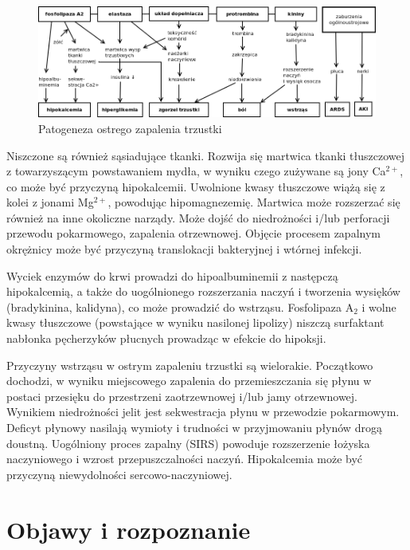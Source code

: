 \documentclass[a4paper, 12pt]{report}
\begin{document}
\begin{figure}[h]
\centering
\includegraphics[scale=0.4]{pat_pan}
\caption{Patogeneza ostrego zapalenia trzustki}
\end{figure}

Niszczone są również sąsiadujące tkanki. Rozwija się martwica tkanki
tłuszczowej z towarzyszącym powstawaniem mydła, w wyniku czego
zużywane są jony Ca$^{2+}$, co może być przyczyną
hipokalcemii. Uwolnione kwasy tłuszczowe wiążą się z kolei z jonami
Mg$^{2+}$, powodując hipomagnezemię. Martwica może rozszerzać się
również na inne okoliczne narządy. Może dojść do niedrożności i/lub
perforacji przewodu pokarmowego, zapalenia otrzewnowej. Objęcie
procesem zapalnym okrężnicy może być przyczyną translokacji
bakteryjnej i wtórnej infekcji.

Wyciek enzymów do krwi prowadzi do hipoalbuminemii z następczą
hipokalcemią, a także do uogólnionego rozszerzania naczyń i tworzenia
wysięków (bradykinina, kalidyna), co może prowadzić do
wstrząsu. Fosfolipaza A$_2$ i wolne kwasy tłuszczowe (powstające w
wyniku nasilonej lipolizy) niszczą surfaktant nabłonka pęcherzyków
płucnych prowadząc w efekcie do hipoksji.

Przyczyny wstrząsu w ostrym zapaleniu trzustki są
wielorakie. Początkowo dochodzi, w wyniku miejscowego zapalenia do
przemieszczania się płynu w postaci przesięku do przestrzeni
zaotrzewnowej i/lub jamy otrzewnowej. Wynikiem niedrożności jelit jest
sekwestracja płynu w przewodzie pokarmowym. Deficyt płynowy nasilają
wymioty i trudności w przyjmowaniu płynów drogą doustną. Uogólniony
proces zapalny (SIRS) powoduje rozszerzenie łożyska naczyniowego i
wzrost przepuszczalności naczyń.  Hipokalcemia może być przyczyną
niewydolności sercowo-naczyniowej.

\chapter{Objawy i rozpoznanie}
\end{document}
